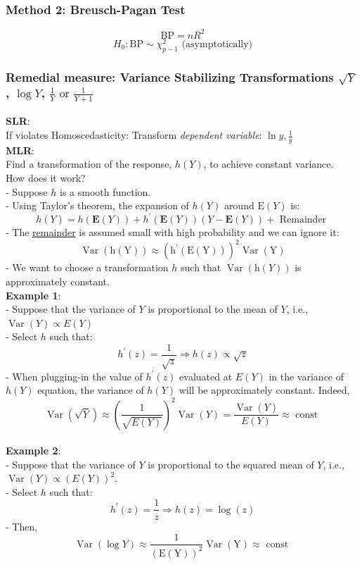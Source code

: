 \documentclass[11pt,a4paper]{article}
\begin{document}
\subsubsection{Method 2: Breusch-Pagan Test}
$$\text{BP}=nR^2$$
$$
    H_0:\text{BP}\sim \chi^2_{p-1} \text{ (asymptotically)}
$$

\subsubsection{Remedial measure: Variance Stabilizing Transformations $\sqrt{Y}$, $\log{Y}$, $\frac{1}{Y}\text{ or }\frac{1}{Y+1}$}
\textbf{SLR}:\\
If violates Homoscedasticity: Transform \textit{dependent variable}: $\ln{y}, \frac{1}{y}$\\

\textbf{MLR}:\\
Find a transformation of the response, $h(Y )$, to achieve constant variance.\\
How does it work?\\
- Suppose $h$ is a smooth function.\\
- Using Taylor's theorem, the expansion of $h(Y)$ around $\mathrm{E}(Y)$ is:
$$
h(Y)=h(\mathbf{E}(Y))+h^{\prime}(\mathbf{E}(Y))(Y-\mathbf{E}(Y))+\text { Remainder }
$$
- The \underline{remainder} is assumed small with high probability and we can ignore it:
$$
\operatorname{Var}(\mathrm{h}(\mathrm{Y})) \approx\left(\mathrm{h}^{\prime}(\mathrm{E}(\mathrm{Y}))\right)^{2} \operatorname{Var}(\mathrm{Y})
$$
- We want to choose a transformation $h$ such that $\operatorname{Var}(\mathrm{h}(Y))$ is approximately constant.\\

\textbf{Example 1}:\\
- Suppose that the variance of $Y$ is proportional to the mean of $Y$, i.e., $\operatorname{Var}(Y) \propto E(Y)$\\
- Select $h$ such that:
$$
h^{\prime}(z)=\frac{1}{\sqrt{z}} \Rightarrow h(z) \propto \sqrt{z}
$$
- When plugging-in the value of $h^{\prime}(z)$ evaluated at $E(Y)$ in the variance of $h(Y)$ equation, the variance of $h(Y)$ will be approximately constant. Indeed,
$$
\operatorname{Var}(\sqrt{Y}) \approx\left(\frac{1}{\sqrt{E(Y)}}\right)^{2} \operatorname{Var}(Y)=\frac{\operatorname{Var}(Y)}{E(Y)} \approx \text { const }
$$\\

\textbf{Example 2}:\\
- Suppose that the variance of $Y$ is proportional to the squared mean of $Y$, i.e., $\operatorname{Var}(Y) \propto(E(Y))^{2}$.\\
- Select $h$ such that:
$$
h^{\prime}(z)=\frac{1}{z} \Rightarrow h(z)=\log (z)
$$
- Then,
$$
\operatorname{Var}(\log Y) \approx \frac{1}{(\mathrm{E}(\mathrm{Y}))^{2}} \operatorname{Var}(\mathrm{Y}) \approx \text { const }
$$\\
\end{document}
